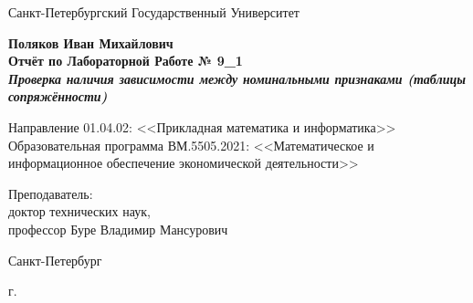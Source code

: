 \begin{titlepage}
	\begin{center}		
		Санкт-Петербургский Государственный Университет

		\vspace{35mm}
		
		\textbf{\large Поляков Иван Михайлович} \\[8mm]
		
		\textbf{\large Отчёт по Лабораторной Работе № 9\_1}\\[3mm]
		\textbf{\textit{\large Проверка наличия зависимости между номинальными признаками (таблицы сопряжённости)}}
		
		\vspace{20mm}
		
		Направление 01.04.02: <<Прикладная математика и информатика>>\\ 
		Образовательная программа ВМ.5505.2021: <<Математическое и информационное обеспечение экономической деятельности>> \\ [30mm]
		
		
		\begin{flushright}
			{Преподаватель:} \\
			доктор технических наук, \\ профессор Буре Владимир Мансурович
		\end{flushright}
		
		\vfill
		
		{Санкт-Петербург}
		\par{\the\year{} г.}
	\end{center}
\end{titlepage}
\restoregeometry
\addtocounter{page}{1}
